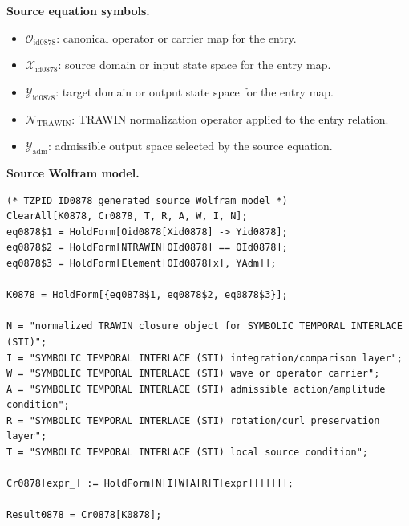 \begin{minipage}[t]{0.49\linewidth}
\begingroup
\small
\raggedright
\textbf{Source equation symbols.}\par
\begin{itemize}[leftmargin=1.35em,itemsep=1pt,topsep=1pt,parsep=0pt]
    \item $\mathcal{O}_{\mathrm{id0878}}$: canonical operator or carrier map for the entry.
    \item $\mathcal{X}_{\mathrm{id0878}}$: source domain or input state space for the entry map.
    \item $\mathcal{Y}_{\mathrm{id0878}}$: target domain or output state space for the entry map.
    \item $\mathcal{N}_{\mathrm{TRAWIN}}$: TRAWIN normalization operator applied to the entry relation.
    \item $\mathcal{Y}_{\mathrm{adm}}$: admissible output space selected by the source equation.
\end{itemize}
\endgroup
\end{minipage}\hfill
\begin{minipage}[t]{0.47\linewidth}
\begingroup
\scriptsize
\raggedright
\textbf{Source Wolfram model.}\par
\begin{Verbatim}[fontsize=\tiny,breaklines=true,breakanywhere=true]
(* TZPID ID0878 generated source Wolfram model *)
ClearAll[K0878, Cr0878, T, R, A, W, I, N];
eq0878$1 = HoldForm[Oid0878[Xid0878] -> Yid0878];
eq0878$2 = HoldForm[NTRAWIN[OId0878] == OId0878];
eq0878$3 = HoldForm[Element[OId0878[x], YAdm]];

K0878 = HoldForm[{eq0878$1, eq0878$2, eq0878$3}];

N = "normalized TRAWIN closure object for SYMBOLIC TEMPORAL INTERLACE (STI)";
I = "SYMBOLIC TEMPORAL INTERLACE (STI) integration/comparison layer";
W = "SYMBOLIC TEMPORAL INTERLACE (STI) wave or operator carrier";
A = "SYMBOLIC TEMPORAL INTERLACE (STI) admissible action/amplitude condition";
R = "SYMBOLIC TEMPORAL INTERLACE (STI) rotation/curl preservation layer";
T = "SYMBOLIC TEMPORAL INTERLACE (STI) local source condition";

Cr0878[expr_] := HoldForm[N[I[W[A[R[T[expr]]]]]]];

Result0878 = Cr0878[K0878];
\end{Verbatim}
\endgroup
\end{minipage}

